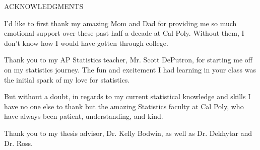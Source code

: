 \begin{center}
ACKNOWLEDGMENTS
\end{center}

I'd like to first thank my amazing Mom and Dad for providing me so much emotional support over these
past half a decade at Cal Poly. Without them, I don't know how I would have gotten through college.

Thank you to my AP Statistics teacher, Mr. Scott DePutron, for starting me off on my statistics journey.
The fun and excitement I had learning in your class was the initial spark of my love for statistics.

But without a doubt, in regards to my current statistical knowledge and skills I have no one else
to thank but the amazing Statistics faculty at Cal Poly, who have always been patient, understanding,
and kind.

Thank you to my thesis advisor, Dr. Kelly Bodwin, as well as Dr. Dekhytar and Dr. Ross.

\clearpage
